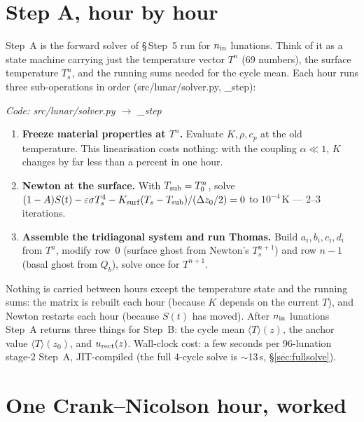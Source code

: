 \documentclass[11pt]{report}
\newcommand{\Tm}{\langle T\rangle}
\newcommand{\code}[1]{{\ttfamily\small #1}}
\begin{document}
\section{Step A, hour by hour}\label{sec:stepA}

Step~A is the forward solver of \S\,Step~5 run for $n_{\rm in}$ lunations. Think
of it as a state machine carrying just the temperature vector $T^n$ (69 numbers),
the surface temperature $T_s^n$, and the running sums needed for the cycle mean.
Each hour runs three sub-operations in order (\code{src/lunar/solver.py},
\code{\_step}):

{\small\color{dim}\textit{Code: \code{src/lunar/solver.py} $\to$ \code{\_step}}}

\begin{enumerate}[leftmargin=1.4em,itemsep=3pt]
\item \textbf{Freeze material properties at $T^n$.} Evaluate $K,\rho,c_p$ at the
  old temperature. This linearisation costs nothing: with the coupling
  $\alpha\ll1$, $K$ changes by far less than a percent in one hour.
\item \textbf{Newton at the surface.} With $T_{\rm sub}=T_0^n$, solve
  $(1-A)S(t)-\varepsilon\sigma T_s^4 - K_{\rm surf}(T_s-T_{\rm sub})/(\Delta z_0/2)=0$
  to $10^{-4}$\,K --- 2--3 iterations.
\item \textbf{Assemble the tridiagonal system and run Thomas.} Build
  $a_i,b_i,c_i,d_i$ from $T^n$, modify row~0 (surface ghost from Newton's
  $T_s^{n+1}$) and row $n{-}1$ (basal ghost from $Q_b$), solve once for
  $T^{n+1}$.
\end{enumerate}

\noindent Nothing is carried between hours except the temperature state and the
running sums: the matrix is rebuilt each hour (because $K$ depends on the current
$T$), and Newton restarts each hour (because $S(t)$ has moved). After
$n_{\rm in}$ lunations Step~A returns three things for Step~B: the cycle mean
$\Tm(z)$, the anchor value $\Tm(z_0)$, and $u_{\rm rect}(z)$. Wall-clock cost:
a few seconds per 96-lunation stage-2 Step~A, JIT-compiled (the full 4-cycle
solve is $\sim$13\,s, \S\ref{sec:fullsolve}).

\section{One Crank--Nicolson hour, worked}\label{sec:cnhour}
\end{document}
